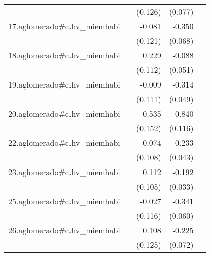 {\begin{longtable}{l*{4}{D{.}{.}{-1}}}
            &                     &     (0.126)         &     (0.077)         &                     \\
\addlinespace
17.aglomerado#c.hv\_miemhabi&                     &      -0.081         &      -0.350\sym{***}&                     \\
            &                     &     (0.121)         &     (0.068)         &                     \\
\addlinespace
18.aglomerado#c.hv\_miemhabi&                     &       0.229\sym{*}  &      -0.088         &                     \\
            &                     &     (0.112)         &     (0.051)         &                     \\
\addlinespace
19.aglomerado#c.hv\_miemhabi&                     &      -0.009         &      -0.314\sym{***}&                     \\
            &                     &     (0.111)         &     (0.049)         &                     \\
\addlinespace
20.aglomerado#c.hv\_miemhabi&                     &      -0.535\sym{***}&      -0.840\sym{***}&                     \\
            &                     &     (0.152)         &     (0.116)         &                     \\
\addlinespace
22.aglomerado#c.hv\_miemhabi&                     &       0.074         &      -0.233\sym{***}&                     \\
            &                     &     (0.108)         &     (0.043)         &                     \\
\addlinespace
23.aglomerado#c.hv\_miemhabi&                     &       0.112         &      -0.192\sym{***}&                     \\
            &                     &     (0.105)         &     (0.033)         &                     \\
\addlinespace
25.aglomerado#c.hv\_miemhabi&                     &      -0.027         &      -0.341\sym{***}&                     \\
            &                     &     (0.116)         &     (0.060)         &                     \\
\addlinespace
26.aglomerado#c.hv\_miemhabi&                     &       0.108         &      -0.225\sym{**} &                     \\
            &                     &     (0.125)         &     (0.072)         &                     \\

\end{longtable}}
